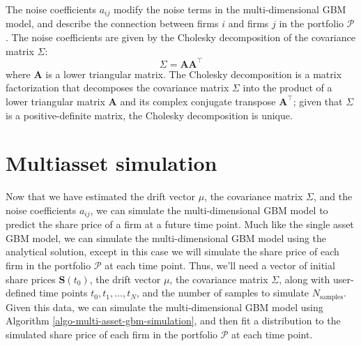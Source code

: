 \documentclass[11pt]{article}
\theoremstyle{definition}
\begin{document}
The noise coefficients $a_{ij}$ modify the noise terms in the multi-dimensional GBM model, 
and describe the connection between firms $i$ and firms $j$ in the portfolio $\mathcal{P}$. 
The noise coefficients are given by the Cholesky decomposition of the covariance matrix $\Sigma$:
\begin{equation*}
\Sigma = \mathbf{A}\mathbf{A}^{\top}
\end{equation*}
where $\mathbf{A}$ is a lower triangular matrix. 
The Cholesky decomposition is a matrix factorization that decomposes the covariance matrix $\Sigma$ 
into the product of a lower triangular matrix $\mathbf{A}$ and its complex conjugate transpose $\mathbf{A}^{\top}$;
given that $\Sigma$ is a positive-definite matrix, the Cholesky decomposition is unique.

\section*{Multiasset simulation}
Now that we have estimated the drift vector $\mu$, the covariance matrix $\Sigma$, and the noise coefficients $a_{ij}$, we can
simulate the multi-dimensional GBM model to predict the share price of a firm at a future time point. 
Much like the single asset GBM model, we can simulate the multi-dimensional GBM model using the analytical solution, 
except in this case we will simulate the share price of each firm in the portfolio $\mathcal{P}$ at each time point.
Thus, we'll need a vector of initial share prices $\mathbf{S}(t_{0})$, the drift vector $\mu$, the covariance matrix $\Sigma$,
along with user-defined time points $t_{0},t_{1},\dots,t_{N}$, and the number of samples to simulate $N_{\text{samples}}$.
Given this data, we can simulate the multi-dimensional GBM model using Algorithm \ref{algo-multi-asset-gbm-simulation}, and then fit a distribution to the simulated share price of each firm in the portfolio $\mathcal{P}$ at each time point.
\end{document}
